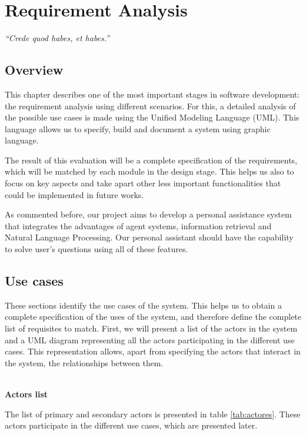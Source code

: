 \chapter{Requirement Analysis}
\label{chap:requirements}

\hfill\emph{``Crede quod habes, et habes.''}


\section{Overview}


This chapter describes one of the most important stages in software development: the requirement analysis using different scenarios. For this, a detailed analysis of the possible use cases is made using the Unified Modeling Language (UML). This language allows us to specify, build and document a system using graphic language. 

The result of this evaluation will be a complete specification of the requirements, which will be matched by each module in the design stage. This helps us also to focus on key aspects and take apart other less important functionalities that could be implemented in future works.

As commented before, our project aims to develop a personal assistance system that integrates the advantages of agent systems, information retrieval and Natural Language Processing. Our personal assistant should have the capability to solve user's questions using all of these features.



\section{Use cases}

These sections identify the use cases of the system. This helps us to obtain a complete specification of the uses of the system, and therefore define the complete list of requisites to match.  First, we will present a list of the actors in the system and a UML diagram representing all the actors participating in the different use cases. This representation allows, apart from specifying the actors that interact in the system, the relationships between them.

~\\
\noindent\textbf{Actors list}

\noindent The list of primary and secondary actors is presented in table \ref{tab:actores}. These actors participate in the different use cases, which are presented later.\\


